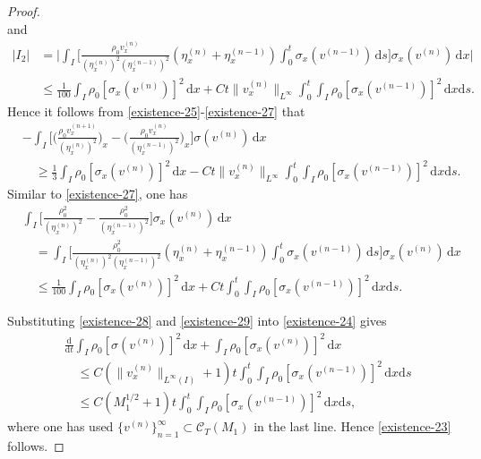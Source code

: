 \documentclass[10pt,a4paper]{amsart}
\newcommand{\diff}{\mathrm{d}}
\begin{document}
\begin{proof}
\begin{equation}
\end{equation}	
and
	\begin{equation}\label{existence-27}
	\begin{aligned}
		|I_2|&=\bigg|\int_I\bigg[\frac{\rho_0v_x^{(n)}}{(\eta_x^{(n)})^2(\eta_x^{(n-1)})^2}(\eta_x^{(n)}+\eta_x^{(n-1)})
		\int_0^t\sigma_x(v^{(n-1)})\,\diff s\bigg]\sigma_x(v^{(n)})\,\diff x\bigg|\\
		&\leq \frac{1}{100}\int_I\rho_0[\sigma_x(v^{(n)})]^2\,\diff x+Ct\|v_x^{(n)}\|_{L^\infty}\int_0^t\int_I\rho_0[\sigma_x(v^{(n-1)})]^2\,\diff x\diff s.
	\end{aligned}
\end{equation}	
Hence it follows from \eqref{existence-25}-\eqref{existence-27} that
	\begin{equation}\label{existence-28}
	\begin{aligned}
		&-\int_I\bigg[\bigg(\frac{\rho_0v_x^{(n+1)}}{(\eta_x^{(n)})^2}\bigg)_x
		-\bigg(\frac{\rho_0v_x^{(n)}}{(\eta_x^{(n-1)})^2}\bigg)_x\bigg]\sigma(v^{(n)})\,\diff x\\
		&\quad\geq \frac{1}{3}\int_I\rho_0[\sigma_x(v^{(n)})]^2\,\diff x-Ct\|v_x^{(n)}\|_{L^\infty}\int_0^t\int_I\rho_0[\sigma_x(v^{(n-1)})]^2\,\diff x\diff s.
	\end{aligned}
\end{equation}		
Similar to \eqref{existence-27}, one has
	\begin{equation}\label{existence-29}
		\begin{aligned}
			&\int_I\bigg[\frac{\rho_0^2}{(\eta_x^{(n)})^2}-\frac{\rho_0^2}{(\eta_x^{(n-1)})^2}\bigg]\sigma_x(v^{(n)})\,\diff x\\
			&\quad=\int_I\bigg[\frac{\rho_0^2}{(\eta_x^{(n)})^2(\eta_x^{(n-1)})^2}(\eta_x^{(n)}+\eta_x^{(n-1)})
			\int_0^t\sigma_x(v^{(n-1)})\,\diff s\bigg]\sigma_x(v^{(n)})\,\diff x\\
			&\quad\leq\frac{1}{100}\int_I\rho_0[\sigma_x(v^{(n)})]^2\,\diff x+Ct\int_0^t\int_I\rho_0[\sigma_x(v^{(n-1)})]^2\,\diff x\diff s. 
		\end{aligned}
	\end{equation}	

Substituting \eqref{existence-28} and \eqref{existence-29} into \eqref{existence-24} gives 
	\begin{equation*}
		\begin{aligned}
			&\frac{\diff}{\diff t}\int_I\rho_0[\sigma(v^{(n)})]^2\,\diff x
			+\int_I\rho_0[\sigma_x(v^{(n)})]^2\,\diff x\\
			&\quad\leq C(\|v_x^{(n)}\|_{L^\infty(I)}+1)t\int_0^t\int_I\rho_0[\sigma_x(v^{(n-1)})]^2\,\diff x\diff s
			\\
			&\quad\leq C(M_1^{1/2}+1)t\int_0^t\int_I\rho_0[\sigma_x(v^{(n-1)})]^2\,\diff x\diff s,
		\end{aligned}
	\end{equation*}	
where one has used \(\{v^{(n)}\}_{n=1}^\infty\subset \mathcal{C}_T(M_1)\) in the last line. Hence \eqref{existence-23} follows.
\end{proof}
\end{document}
